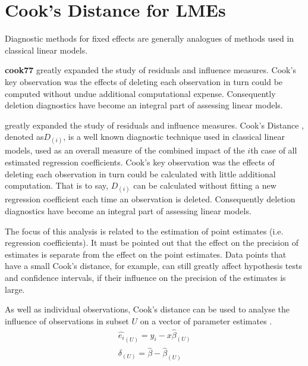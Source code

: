 \documentclass[12pt, a4paper]{article}
\begin{document}
\section{Cook's Distance for LMEs} %
Diagnostic methods for fixed effects are generally analogues of methods used in classical linear models.

\textbf{cook77} greatly expanded the study of residuals and influence measures. Cook's key observation was the effects of deleting each observation in turn could be computed without undue additional computational expense. Consequently deletion diagnostics have become an integral part of assessing linear models.



\citet{cook77} greatly expanded the study of residuals and influence measures. Cook's Distance , denoted as$D_{(i)}$, is a well known diagnostic technique used in classical linear models, used as an overall measure of the combined impact of the $i$th case of all estimated regression coefficients. Cook's key observation was the effects of deleting each observation in turn could be calculated with little additional computation. That is to say, $D_{(i)}$ can be calculated without fitting a new regression coefficient each time an observation is deleted.  Consequently deletion diagnostics have become an integral part of assessing linear models. 

\bigskip

The focus of this analysis is related to the estimation of point estimates (i.e. regression coefficients). It must be pointed out that the effect on the precision of estimates is separate from the effect on the point estimates. Data points that
have a small Cook's distance, for example, can still greatly affect hypothesis tests and confidence intervals, if their  influence on the precision of the estimates is large.

As well as individual observations, Cook's distance can be used to analyse the influence of observations in subset $U$ on a vector of parameter estimates \citep{cook77}.
\begin{eqnarray}
\hat{e_{i}}_{(U)} = y_{i} - x\hat{\beta}_{(U)}\\
\delta_{(U)} = \hat{\beta} - \hat{\beta}_{(U)}
\end{eqnarray}
\end{document}
